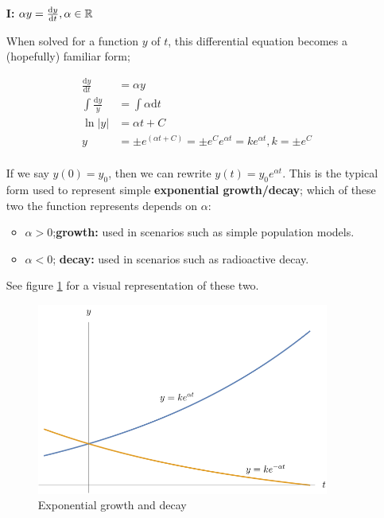 \documentclass[12pt]{article}
\begin{document}
\begin{itemize}
    \item[\textbf{I:}] $\alpha y = \frac{\text{d}y}{\text{d}t}, \alpha \in \mathbb{R}$ 
    
    When solved for a function $y$ of $t$, this differential equation becomes a (hopefully) familiar form;
    
    \begin{equation}
        \begin{split}
            \frac{\text{d}y}{\text{d}t} &= \alpha y\\
            \int \frac{\text{d}y}{y} &= \int \alpha \text{d}t\\
            \ln|y|&=\alpha t + C\\
            y &= \pm e^{(\alpha t + C)} = \pm e^C e^{\alpha t} = k e^{\alpha t}, k = \pm e^C\\
        \end{split}
    \end{equation}
    
    If we say $y(0) = y_0$, then we can rewrite $y(t)=y_0e^{\alpha t}$. This is the typical form used to represent simple \textbf{exponential growth/decay}; which of these two the function represents depends on $\alpha$:
    
    \begin{itemize}
        \item $\alpha > 0$;\textbf{growth:} used in scenarios such as simple population models.
        \item $\alpha < 0$; \textbf{decay:} used in scenarios such as radioactive decay.
    \end{itemize}
    
    See figure \ref{fig:exponentialgrowthndecay} for a visual representation of these two.
    
    \begin{figure}[!ht]
        \centering
        \includegraphics[width=9.6cm]{misc/exponentialgnd.png}
        \caption{Exponential growth and decay}
        \label{fig:exponentialgrowthndecay}%
    \end{figure}
    

\end{itemize}
\end{document}
